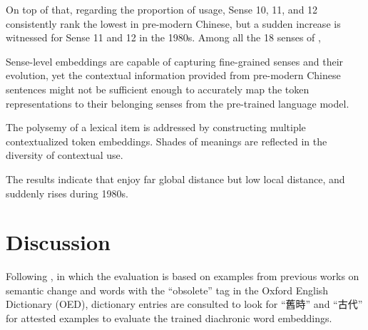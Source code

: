 On top of that, regarding the proportion of usage, Sense 10, 11, and 12 consistently rank the lowest in pre-modern Chinese, but a sudden increase is witnessed for Sense 11 and 12 in the 1980s. Among all the 18 senses of \jia\rspace , 

Sense-level embeddings are capable of capturing fine-grained senses and their evolution, yet the contextual information provided from pre-modern Chinese sentences might not be sufficient enough to accurately map the token representations to their belonging senses from the pre-trained language model.


The polysemy of a lexical item is addressed by constructing multiple contextualized token embeddings. Shades of meanings are reflected in the diversity of contextual use.

The results indicate that \jia enjoy far global distance but low local distance, and suddenly rises during 1980s.






\section{Discussion}

Following \textcite{hamilton2016law}, in which the evaluation is based on examples from previous works on semantic change and words with the ``obsolete'' tag in the Oxford English Dictionary (OED), dictionary entries are consulted to look for ``舊時'' and ``古代'' for attested examples to evaluate the trained diachronic word embeddings.

